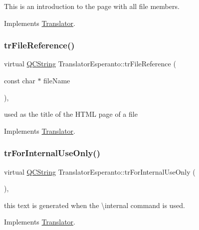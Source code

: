 This is an introduction to the page with all file members. 

Implements \mbox{\hyperlink{class_translator}{Translator}}.

\mbox{\label{class_translator_esperanto_addfd3e5d2d1b4f890bb94d0d02700b2b}} 
\subsubsection{\texorpdfstring{trFileReference()}{trFileReference()}}
{\footnotesize\ttfamily virtual \mbox{\hyperlink{class_q_c_string}{Q\+C\+String}} Translator\+Esperanto\+::tr\+File\+Reference (\begin{DoxyParamCaption}\item[{const char $\ast$}]{file\+Name }\end{DoxyParamCaption})\hspace{0.3cm}{\ttfamily [inline]}, {\ttfamily [virtual]}}

used as the title of the H\+T\+ML page of a file 

Implements \mbox{\hyperlink{class_translator}{Translator}}.

\mbox{\label{class_translator_esperanto_abcb9e404c59c5ad8f19465a9087589c1}} 
\subsubsection{\texorpdfstring{trForInternalUseOnly()}{trForInternalUseOnly()}}
{\footnotesize\ttfamily virtual \mbox{\hyperlink{class_q_c_string}{Q\+C\+String}} Translator\+Esperanto\+::tr\+For\+Internal\+Use\+Only (\begin{DoxyParamCaption}{ }\end{DoxyParamCaption})\hspace{0.3cm}{\ttfamily [inline]}, {\ttfamily [virtual]}}

this text is generated when the \textbackslash{}internal command is used. 

Implements \mbox{\hyperlink{class_translator}{Translator}}.

